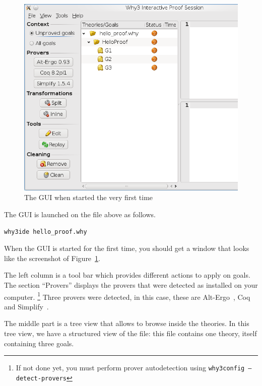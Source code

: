 \begin{figure}[tbp]
  \includegraphics[width=\textwidth]{gui-0-70-1.png}
  \caption{The GUI when started the very first time}
  \label{fig:gui1}
\end{figure}

The GUI is launched on the file above as follows.
\begin{verbatim}
why3ide hello_proof.why
\end{verbatim}
When the GUI is started for the first time, you should get a window
that looks like the screenshot of Figure~\ref{fig:gui1}.

The left column is a tool bar which provides different actions to
apply on goals. The section ``Provers'' displays the provers that were
detected as installed on your computer.%
\footnote{If not done yet, you
  must perform prover autodetection using \texttt{why3config
    --detect-provers}}
Three provers were detected, in this case,
these are Alt-Ergo~\cite{ergo}, Coq~\cite{CoqArt} and
Simplify~\cite{simplify05}.

The middle part is a tree view that
allows to browse inside the theories.
In this tree view, we have a structured view of the file: this file
contains one theory, itself containing three goals.


